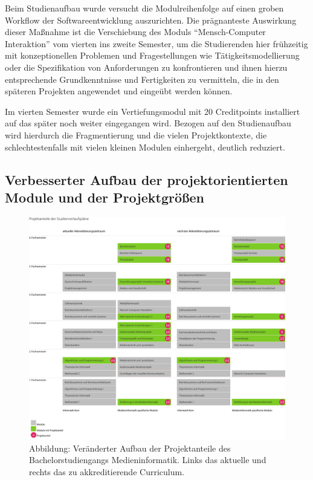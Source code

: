 Beim Studienaufbau wurde versucht die Modulreihenfolge auf einen groben
Workflow der Softwareentwicklung auszurichten. Die prägnanteste
Auswirkung dieser Maßnahme ist die Verschiebung des Moduls
``Mensch-Computer Interaktion'' vom vierten ins zweite Semester, um die
Studierenden hier frühzeitig mit konzeptionellen Problemen und
Fragestellungen wie Tätigkeitsmodellierung oder die Spezifikation von
Anforderungen zu konfrontieren und ihnen hierzu entsprechende
Grundkenntnisse und Fertigkeiten zu vermitteln, die in den späteren
Projekten angewendet und eingeübt werden können.

Im vierten Semester wurde ein Vertiefungsmodul mit 20 Creditpoints
installiert auf das später noch weiter eingegangen wird. Bezogen auf den
Studienaufbau wird hierdurch die Fragmentierung und die vielen
Projektkontexte, die schlechtestenfalls mit vielen kleinen Modulen
einhergeht, deutlich reduziert.

\subsection{Verbesserter Aufbau der projektorientierten Module und
der
Projektgrößen}\label{verbesserter-aufbau-der-projektorientierten-module-und-der-projektgruxf6uxdfen}

\begin{figure}[htbp]
\centering
\includegraphics[width=\columnwidth]{../anhaenge/bilder/ba-projektanteile.png}
\caption{Abbildung: Veränderter Aufbau der Projektanteile des
Bachelorstudiengangs Medieninformatik. Links das aktuelle und rechts das
zu akkreditierende Curriculum.}
\end{figure}

